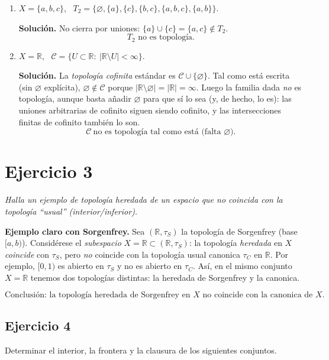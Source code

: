 \documentclass[12pt]{article}
\begin{document}
\begin{enumerate}
\item $X=\{a,b,c\}$, \ 
$T_2=\{\varnothing,\{a\},\{c\},\{b,c\},\{a,b,c\},\{a,b\}\}$.

\textbf{Solución.}
No cierra por uniones: 
\(\{a\}\cup\{c\}=\{a,c\}\notin T_2\).
\[
\boxed{T_2\text{ no es topología.}}
\]

\item $X=\mathbb{R}$, \ 
$\mathcal{C}=\{U\subset\mathbb{R}:\ |\mathbb{R}\setminus U|<\infty\}$.

\textbf{Solución.}
La \emph{topología cofinita} estándar es 
\(\mathcal{C}\cup\{\varnothing\}\).
Tal como está escrita (sin $\varnothing$ explícita),
\(\varnothing\notin\mathcal{C}\) porque 
\(|\mathbb{R}\setminus\varnothing|=|\mathbb{R}|=\infty\).
Luego la familia dada \emph{no} es topología,
aunque basta añadir $\varnothing$ para que sí lo sea (y, de hecho, lo es):
las uniones arbitrarias de cofinito siguen siendo cofinito,
y las intersecciones finitas de cofinito también lo son.
\[
\boxed{\mathcal{C}\ \text{no es topología tal como está (falta }\varnothing).}
\]
\end{enumerate}

\section*{Ejercicio 3}
\emph{Halla un ejemplo de topología heredada de un espacio que no coincida con la topología “usual” (interior/inferior).}

\textbf{Ejemplo claro con Sorgenfrey.}
Sea \( (\mathbb{R},\tau_S) \) la topología de Sorgenfrey (base \( [a,b) \)).
Considérese el \emph{subespacio} \(X=\mathbb{R}\subset(\mathbb{R},\tau_S)\):
la topología \emph{heredada} en \(X\) \emph{coincide} con \(\tau_S\),
pero \emph{no} coincide con la topología usual canonica \(\tau_C\) en \(\mathbb{R}\).
Por ejemplo, \( [0,1) \) es abierto en \(\tau_S\) y no es abierto en \(\tau_C\).
Así, en el mismo conjunto \(X=\mathbb{R}\) tenemos dos topologías distintas:
la heredada de Sorgenfrey y la canonica.

\[
\boxed{\text{Conclusión: la topología heredada de Sorgenfrey en }X
\text{ no coincide con la canonica de }X.}
\]

\subsection*{Ejercicio 4}
Determinar el interior, la frontera y la clausura de los siguientes conjuntos.
\end{document}
